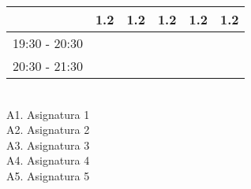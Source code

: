 \documentclass[10pt,spanish, landscape, twocolumn]{article}
\begin{document}
\begin{flushleft}
\begin{tabular}{|c|c|c|c|c|c|}
& \cellcolor{grisclaro} {\footnotesize 1.2}& \cellcolor{grisclaro} {\footnotesize 1.2}& \cellcolor{grisclaro} {\footnotesize 1.2}& \cellcolor{grisclaro} {\footnotesize 1.2}& \cellcolor{grisclaro} {\footnotesize 1.2} \\
\hline
\multirow{2}{*}{19:30 - 20:30} & & & & & \\
& & & & & \\
\hline
\multirow{2}{*}{20:30 - 21:30} & & & & & \\
& & & & & \\
\hline
\end{tabular}
\\[0.25cm]

A1. Asignatura 1 \\[0.5cm]

A2. Asignatura 2 \\[0.5cm]

A3. Asignatura 3 \\[0.5cm]

A4. Asignatura 4 \\[0.5cm]

A5. Asignatura 5 \\[0.5cm]

\end{flushleft}
\end{document}
